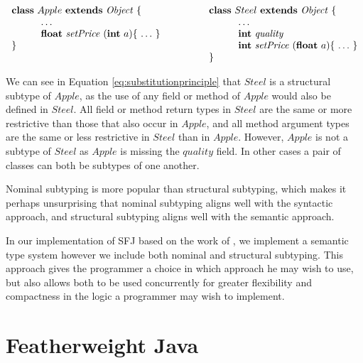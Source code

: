 \documentclass{l4proj}
\begin{document}
\begin{equation}
    \label{eq:substitutionprinciple}
    \begin{array}{ll}
        \syndecl{Apple}{\mathit{Object}} {
         &
            \qquad
            \syndecl{Steel}{\mathit{Object}} {
                \\
                \qquad\quad \ldots \qquad
         &
                \qquad\qquad\quad \ldots
                \\
                \qquad\quad \textbf{float}\ \mathit{setPrice}\ (\textbf{int}\ a)\{\ \ldots\ \}\qquad
         &
                \qquad\qquad\quad \textbf{int}\ \mathit{quality}
                \\
            }
            \qquad\quad\qquad
         &
            \qquad\qquad\quad \textbf{int}\ \mathit{setPrice}\ (\textbf{float}\ a)\{\ \ldots\ \}
            \\
         &
            \qquad }
    \end{array}
\end{equation}

We can see in Equation \ref{eq:substitutionprinciple} that $Steel$ is a structural subtype of $Apple$, as the use of any field or method of $Apple$ would also be defined in $Steel$.
All field or method return types in $Steel$ are the same or more restrictive than those that also occur in $Apple$, and all method argument types are the same or less restrictive in $Steel$ than in $Apple$.
However, $Apple$ is not a subtype of $Steel$ as $Apple$ is missing the $quality$ field.
In other cases a pair of classes can both be subtypes of one another.

Nominal subtyping is more popular than structural subtyping, which makes it perhaps unsurprising that nominal subtyping aligns well with the syntactic approach, and structural subtyping aligns well with the semantic approach.

In our implementation of SFJ based on the work of \citet{Dardha2017, Dardha2013}, we implement a semantic type system however we include both nominal and structural subtyping.
This approach gives the programmer a choice in which approach he may wish to use, but also allows both to be used concurrently for greater flexibility and compactness in the logic a programmer may wish to implement.

\section{Featherweight Java}
\end{document}
